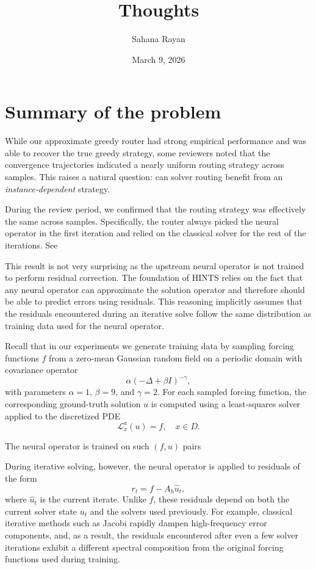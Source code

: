 \documentclass[12pt]{article}
\begin{document}
\title{Thoughts}
\author{Sahana Rayan}
\date{March 9, 2026}
\maketitle
\section{Summary of the problem}

While our approximate greedy router had strong empirical performance and was able to recover the true greedy strategy, some reviewers noted that the convergence trajectories indicated a nearly uniform routing strategy across samples. This raises a natural question: can solver routing benefit from an \textit{instance-dependent} strategy. 

During the review period, we confirmed that the routing strategy was effectively the same across samples. Specifically, the router always picked the neural operator in the first iteration and relied on the classical solver for the rest of the iterations. See 

This result is not very surprising as the upstream neural operator is not trained to perform residual correction. The foundation of HINTS relies on the fact that any neural operator can approximate the solution operator and therefore should be able to predict errors using residuals. This reasoning implicitly assumes that the residuals encountered during an iterative solve follow the same distribution as training data used for the neural operator. 

Recall that in our experiments we generate training data by sampling forcing functions $f$ from a zero-mean Gaussian random field on a periodic domain with covariance operator
\[
\alpha(-\Delta + \beta I)^{-\gamma},
\]
with parameters $\alpha = 1$, $\beta = 9$, and $\gamma = 2$. For each sampled forcing function, the corresponding ground-truth solution $u$ is computed using a least-squares solver applied to the discretized PDE
\[
\mathcal{L}_x^a(u) = f, \quad x \in D.
\]

The neural operator is trained on such $(f, u)$ pairs

During iterative solving, however, the neural operator is applied to residuals of the form
\[
r_t = f - A_h \widehat{u}_t,
\]
where $\widehat{u}_t$ is the current iterate. Unlike $f$, these residuals depend on both the current solver state $u_t$ and the solvers used previously. For example, classical iterative methods such as Jacobi rapidly dampen high-frequency error components, and, as a result, the residuals encountered after even a few solver iterations exhibit a different spectral composition from the original forcing functions used during training.
\end{document}
